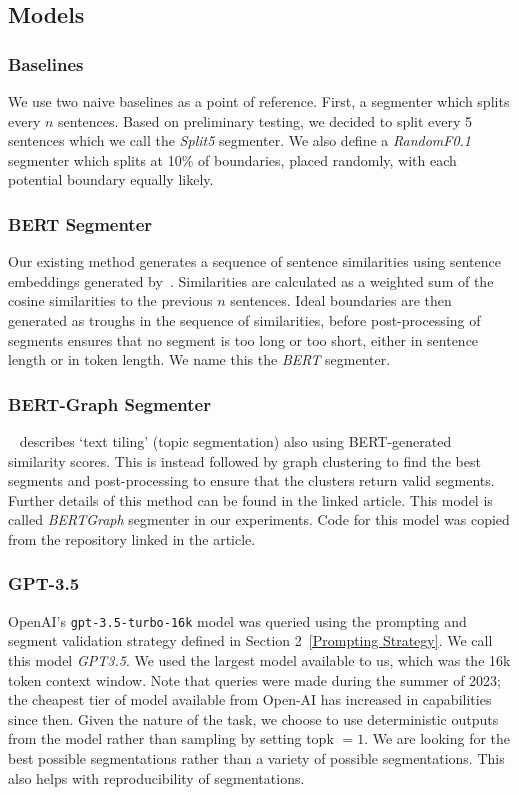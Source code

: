 \subsection{Models}

\subsubsection{Baselines}

We use two naive baselines as a point of reference. First, a segmenter which splits every $n$ sentences. Based on preliminary testing, we decided to split every 5 sentences which we call the \emph{Split5} segmenter. We also define a \emph{RandomF0.1} segmenter which splits at 10\% of boundaries, placed randomly, with each potential boundary equally likely.

\subsubsection{BERT Segmenter}

Our existing method generates a sequence of sentence similarities using sentence embeddings generated by~\cite{SentenceBERT}. Similarities are calculated as a weighted sum of the cosine similarities to the previous $n$ sentences. Ideal boundaries are then generated as troughs in the sequence of similarities, before post-processing of segments ensures that no segment is too long or too short, either in sentence length or in token length. We name this the \emph{BERT} segmenter.

\subsubsection{BERT-Graph Segmenter}

~\cite{MasimilianoSegmenter} describes `text tiling' (topic segmentation) also using BERT-generated similarity scores. This is instead followed by graph clustering to find the best segments and post-processing to ensure that the clusters return valid segments. Further details of this method can be found in the linked article. This model is called \emph{BERTGraph} segmenter in our experiments. Code for this model was copied from the repository linked in the article.

\subsubsection{GPT-3.5}

OpenAI's \texttt{gpt-3.5-turbo-16k} model was queried using the prompting and segment validation strategy defined in Section 2~\ref{Prompting Strategy}. We call this model \emph{GPT3.5}. We used the largest model available to us, which was the 16k token context window. Note that queries were made during the summer of 2023; the cheapest tier of model available from Open-AI has increased in capabilities since then. Given the nature of the task, we choose to use deterministic outputs from the model rather than sampling by setting topk $=1$. We are looking for the best possible segmentations rather than a variety of possible segmentations. This also helps with reproducibility of segmentations.

